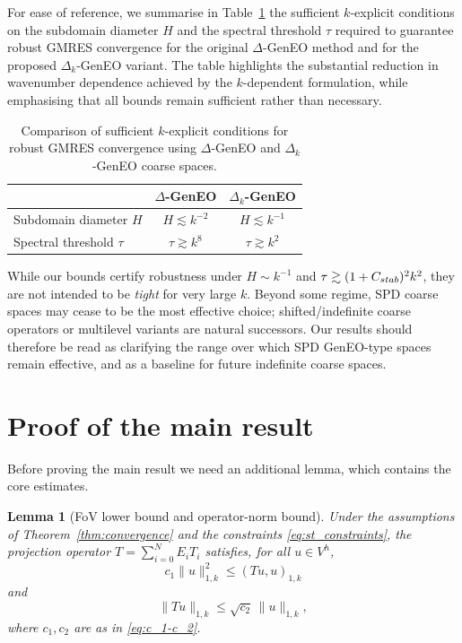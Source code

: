\documentclass[preprint,3p,times]{elsarticle}
\newcommand{\Cstab}{C_{\textup{\textsf{stab}}}}
\newtheorem{lemma}[theorem]{Lemma}
\theoremstyle{definition}
\numberwithin{equation}{section}
\begin{document}
{For ease of reference, we summarise in Table~\ref{tab:summary_bounds} the sufficient $k$-explicit conditions on the subdomain diameter $H$ and the spectral threshold $\tau$ required to guarantee robust GMRES convergence for the original $\Delta$-GenEO method and for the proposed $\Delta_k$-GenEO variant. 
The table highlights the substantial reduction in wavenumber dependence achieved by the $k$-dependent formulation, while emphasising that all bounds remain sufficient rather than necessary.
\begin{table}[h]
\centering
\caption{Comparison of sufficient $k$-explicit conditions for robust GMRES convergence using $\Delta$-GenEO and $\Delta_k$-GenEO coarse spaces.}
\label{tab:summary_bounds}
\begin{tabular}{lcc}
\toprule
& \color{myred} $\Delta$-GenEO & \color{myred} $\Delta_k$-GenEO \\
\midrule
\color{myred} Subdomain diameter $H$ 
& \color{myred} $H \lesssim k^{-2}$ 
& \color{myred} $H \lesssim k^{-1}$ \\[0.5ex]
\color{myred} Spectral threshold $\tau$ 
& \color{myred} $\tau \gtrsim k^{8}$ 
& \color{myred} $\tau \gtrsim k^{2}$ \\
\bottomrule
\end{tabular}
\end{table}}
 
{While our bounds certify robustness under $H\sim k^{-1}$ and $\tau\gtrsim (1+\Cstab)^2 k^2$, 
they are not intended to be \emph{tight} for very large $k$.  Beyond some regime, SPD coarse spaces may cease 
to be the most effective choice; shifted/indefinite coarse operators or multilevel variants are natural successors. 
Our results should therefore be read as clarifying the range over which SPD GenEO-type spaces remain effective, 
and as a baseline for future indefinite coarse spaces.}

\section{Proof of the main result}
\label{sec:proof}

\noindent
Before proving the main result we need an additional lemma, {which contains the core estimates}.

\begin{lemma}[FoV lower bound and operator-norm bound]\label{ther: 4_1}
Under the assumptions of Theorem~\ref{thm:convergence} and the constraints \eqref{eq:st_constraints}, the projection operator
$T=\sum_{i=0}^N E_i T_i$ satisfies, for all \(u\in V^h\),
\begin{equation}\label{eq:FoV-lower}
	c_1\|u\|_{1, k}^2 \le (Tu,u)_{1, k}
\end{equation}
and
\begin{equation}\label{eq:op-norm-upper}
	\|Tu\|_{1, k} \le \sqrt{c_2}\,\|u\|_{1,k},
\end{equation}
where $c_1,c_2$ are as in \eqref{eq:c_1-c_2}.

\end{lemma}
\end{document}
